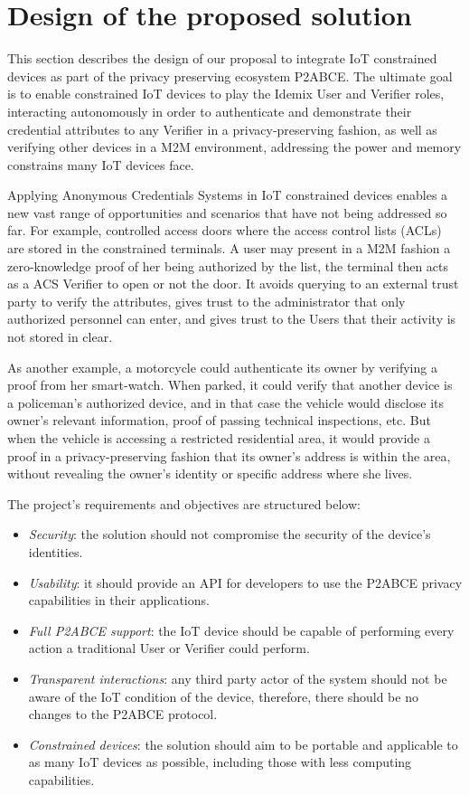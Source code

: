 
\section{Design of the proposed solution}\label{ch:design}

This section describes the design of our proposal to integrate IoT constrained devices as part of the privacy preserving ecosystem P2ABCE. The ultimate goal is to enable constrained IoT devices to play the Idemix User and Verifier roles, interacting autonomously in order to authenticate and demonstrate their credential attributes to any Verifier in a privacy-preserving fashion, as well as verifying other devices in a M2M environment, addressing the power and memory constrains many IoT devices face. 

Applying Anonymous Credentials Systems in IoT constrained devices enables a new vast range of opportunities and scenarios that have not being addressed so far. For example, controlled access doors where the access control lists (ACLs) are stored in the constrained terminals. A user may present in a M2M fashion a zero-knowledge proof of her being authorized by the list, the terminal then acts as a ACS Verifier to open or not the door. It avoids querying to an external trust party to verify the attributes, gives trust to the administrator that only authorized personnel can enter, and gives trust to the Users that their activity is not stored in clear. 

As another example, a motorcycle could authenticate its owner by verifying a proof from her smart-watch. When parked, it could verify that another device is a policeman's authorized device, and in that case the vehicle would disclose its owner's relevant information, proof of passing technical inspections, etc. But when the vehicle is accessing a restricted residential area, it would provide a proof in a privacy-preserving fashion that its owner's address is within the area, without revealing the owner's identity or specific address where she lives. 


The project's requirements and objectives are structured below:

\begin{itemize}
	\item \textit{Security}: the solution should not compromise the security of the device's identities.
	\item \textit{Usability}: it should provide an API for developers to use the P2ABCE privacy capabilities in their applications.
	\item \textit{Full P2ABCE support}: the IoT device should be capable of performing every action a traditional User or Verifier could perform.
	\item \textit{Transparent interactions}: any third party actor of the system should not be aware of the IoT condition of the device, therefore, there should be no changes to the P2ABCE protocol.
	\item \textit{Constrained devices}: the solution should aim to be portable and applicable to as many IoT devices as possible, including those with less computing capabilities.
\end{itemize}

